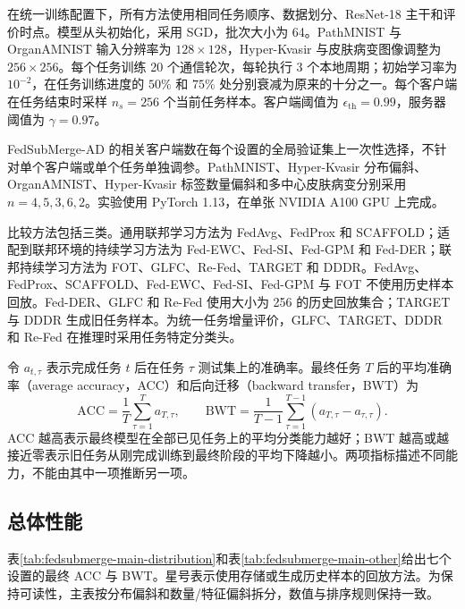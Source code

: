 在统一训练配置下，所有方法使用相同任务顺序、数据划分、ResNet-18 主干和评价时点\cite{he2016resnet}。模型从头初始化，采用 SGD，批次大小为 64。PathMNIST 与 OrganAMNIST 输入分辨率为 $128\times128$，Hyper-Kvasir 与皮肤病变图像调整为 $256\times256$。每个任务训练 20 个通信轮次，每轮执行 3 个本地周期；初始学习率为 $10^{-2}$，在任务训练进度的 $50\%$ 和 $75\%$ 处分别衰减为原来的十分之一。每个客户端在任务结束时采样 $n_s=256$ 个当前任务样本。客户端阈值为 $\epsilon_{\mathrm{th}}=0.99$，服务器阈值为 $\gamma=0.97$。

FedSubMerge-AD 的相关客户端数在每个设置的全局验证集上一次性选择，不针对单个客户端或单个任务单独调参。PathMNIST、Hyper-Kvasir 分布偏斜、OrganAMNIST、Hyper-Kvasir 标签数量偏斜和多中心皮肤病变分别采用 $n=4,5,3,6,2$。实验使用 PyTorch 1.13，在单张 NVIDIA A100 GPU 上完成。

比较方法包括三类。通用联邦学习方法为 FedAvg、FedProx 和 SCAFFOLD\cite{mcmahan2017fedavg,li2020fedprox,karimireddy2020scaffold}；适配到联邦环境的持续学习方法为 Fed-EWC、Fed-SI、Fed-GPM 和 Fed-DER\cite{kirkpatrick2017ewc,method_regu_si,saha2021gpm,method_replay_der}；联邦持续学习方法为 FOT、GLFC、Re-Fed、TARGET 和 DDDR\cite{bakman2024fot,dong2022glfc,li2024Refed,zhang2023target,liang2024dddr}。FedAvg、FedProx、SCAFFOLD、Fed-EWC、Fed-SI、Fed-GPM 与 FOT 不使用历史样本回放。Fed-DER、GLFC 和 Re-Fed 使用大小为 256 的历史回放集合；TARGET 与 DDDR 生成旧任务样本。为统一任务增量评价，GLFC、TARGET、DDDR 和 Re-Fed 在推理时采用任务特定分类头。

令 $a_{t,\tau}$ 表示完成任务 $t$ 后在任务 $\tau$ 测试集上的准确率。最终任务 $T$ 后的平均准确率（average accuracy，ACC）和后向迁移（backward transfer，BWT）为\cite{method_replay_gem}
\begin{equation}
\mathrm{ACC}
=
\frac{1}{T}\sum_{\tau=1}^{T}a_{T,\tau},
\qquad
\mathrm{BWT}
=
\frac{1}{T-1}\sum_{\tau=1}^{T-1}
\left(a_{T,\tau}-a_{\tau,\tau}\right).
\label{eq:fedsubmerge-acc-bwt}
\end{equation}
ACC 越高表示最终模型在全部已见任务上的平均分类能力越好；BWT 越高或越接近零表示旧任务从刚完成训练到最终阶段的平均下降越小。两项指标描述不同能力，不能由其中一项推断另一项。

\subsection{总体性能}
\label{subsec:fedsubmerge-main-results}

表\ref{tab:fedsubmerge-main-distribution}和表\ref{tab:fedsubmerge-main-other}给出七个设置的最终 ACC 与 BWT。星号表示使用存储或生成历史样本的回放方法。为保持可读性，主表按分布偏斜和数量/特征偏斜拆分，数值与排序规则保持一致。

